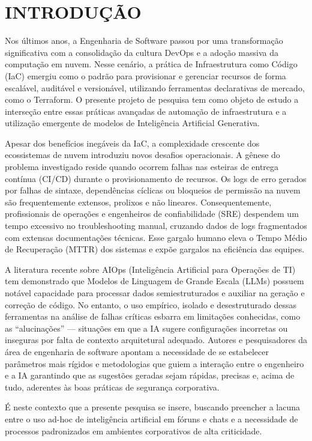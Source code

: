 \section{INTRODUÇÃO}

Nos últimos anos, a Engenharia de Software passou por uma transformação significativa com a consolidação da cultura DevOps e a adoção massiva da computação em nuvem. Nesse cenário, a prática de Infraestrutura como Código (IaC) emergiu como o padrão para provisionar e gerenciar recursos de forma escalável, auditável e versionável, utilizando ferramentas declarativas de mercado, como o Terraform. O presente projeto de pesquisa tem como objeto de estudo a interseção entre essas práticas avançadas de automação de infraestrutura e a utilização emergente de modelos de Inteligência Artificial Generativa.

Apesar dos benefícios inegáveis da IaC, a complexidade crescente dos ecossistemas de nuvem introduziu novos desafios operacionais. A gênese do problema investigado reside quando ocorrem falhas nas esteiras de entrega contínua (CI/CD) durante o provisionamento de recursos. Os logs de erro gerados por falhas de sintaxe, dependências cíclicas ou bloqueios de permissão na nuvem são frequentemente extensos, prolixos e não lineares. Consequentemente, profissionais de operações e engenheiros de confiabilidade (SRE) despendem um tempo excessivo no troubleshooting manual, cruzando dados de logs fragmentados com extensas documentações técnicas. Esse gargalo humano eleva o Tempo Médio de Recuperação (MTTR) dos sistemas e expõe gargalos na eficiência das equipes.

A literatura recente sobre AIOps (Inteligência Artificial para Operações de TI) tem demonstrado que Modelos de Linguagem de Grande Escala (LLMs) possuem notável capacidade para processar dados semiestruturados e auxiliar na geração e correção de código. No entanto, o uso empírico, isolado e desestruturado dessas ferramentas na análise de falhas críticas esbarra em limitações conhecidas, como as ``alucinações'' --- situações em que a IA sugere configurações incorretas ou inseguras por falta de contexto arquitetural adequado. Autores e pesquisadores da área de engenharia de software apontam a necessidade de se estabelecer parâmetros mais rígidos e metodologias que guiem a interação entre o engenheiro e a IA garantindo que as sugestões geradas sejam rápidas, precisas e, acima de tudo, aderentes às boas práticas de segurança corporativa.

É neste contexto que a presente pesquisa se insere, buscando preencher a lacuna entre o uso ad-hoc de inteligência artificial em fóruns e chats e a necessidade de processos padronizados em ambientes corporativos de alta criticidade.

